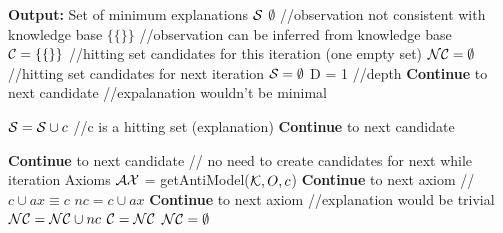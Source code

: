   
   \begin{algorithm}[t!]
    \begin{algorithmic}[1]
    	\State \textbf{Output:} Set of minimum explanations $\S$
			\State \Return $\emptyset$   //observation not consistent with knowledge base 
		\EndIf
			\State \Return $\{ \{ \} \}$ //observation can be inferred from knowledge base
		\EndIf
	\State $\C = \{ \{ \} \}$ //hitting set candidates for this iteration (one empty set)
	\State $\NC = \emptyset$ //hitting set candidates for next iteration
	\State $ \S = \emptyset $ 
	\State D = 1 //depth
					\State \textbf{Continue} to next candidate //expalanation wouldn't be minimal
				\EndIf
			\EndFor
			
					\State $\S = \S \cup c$ //c is a hitting set (explanation)
				\EndIf
				\State \textbf{Continue} to next candidate
			\EndIf
			
				\State \textbf{Continue} to next candidate // no need to create candidates for next while iteration
			\EndIf
			\State Axioms $\AX$ = getAntiModel($\K, O,  c$)
					\State \textbf{Continue} to next axiom //$c \cup ax \equiv c$
				\EndIf
				\State $nc = c \cup ax$
					\State \textbf{Continue} to next axiom //explanation would be trivial
				\EndIf
				\State $\NC = \NC \cup nc$
			\EndFor
		\EndFor
	\State $\C = \NC$
	\State $\NC = \emptyset$
	\EndWhile


\end{algorithmic}
\end{algorithm}

